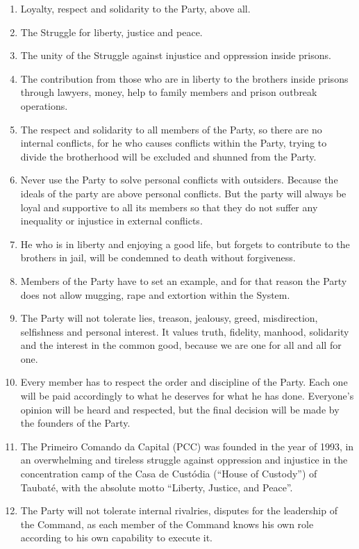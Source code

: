 \begin{enumerate}
\item Loyalty, respect and solidarity to the Party, above all.
\item The Struggle for liberty, justice and peace.
\item The unity of the Struggle against injustice and oppression inside prisons.
\item The contribution from those who are in liberty to the brothers inside prisons through lawyers, money, help to family members and prison outbreak operations.
\item The respect and solidarity to all members of the Party, so there are no internal conflicts, for he who causes conflicts within the Party, trying to divide the brotherhood will be excluded and shunned from the Party.
\item Never use the Party to solve personal conflicts with outsiders. Because the ideals of the party are above personal conflicts. But the party will always be loyal and supportive to all its members so that they do not suffer any inequality or injustice in external conflicts.
\item He who is in liberty and enjoying a good life, but forgets to contribute to the brothers in jail, will be condemned to death without forgiveness.
\item Members of the Party have to set an example, and for that reason the Party does not allow mugging, rape and extortion within the System.
\item The Party will not tolerate lies, treason, jealousy, greed, misdirection, selfishness and personal interest. It values truth, fidelity, manhood, solidarity and the interest in the common good, because we are one for all and all for one.
\item Every member has to respect the order and discipline of the Party. Each one will be paid accordingly to what he deserves for what he has done. Everyone's opinion will be heard and respected, but the final decision will be made by the founders of the Party.
\item The Primeiro Comando da Capital (PCC) was founded in the year of 1993, in an overwhelming and tireless struggle against oppression and injustice in the concentration camp of the Casa de Cust\'{o}dia (``House of Custody'') of Taubat\'{e}, with the absolute motto ``Liberty, Justice, and Peace''.
\item The Party will not tolerate internal rivalries, disputes for the leadership of the Command, as each member of the Command knows his own role according to his own capability to execute it.

\end{enumerate}
